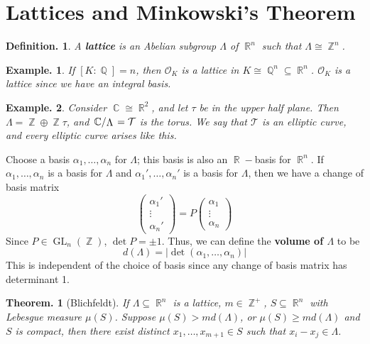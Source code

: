\documentclass[11pt, a4paper]{memoir}
\DeclareMathOperator{\Q}{{\mathbb{Q}}}
\DeclareMathOperator{\Z}{{\mathbb{Z}}}
\DeclareMathOperator{\R}{{\mathbb{R}}}
\DeclareMathOperator{\C}{{\mathbb{C}}}
\theoremstyle{change}
\newtheorem{theorem}{Theorem.}[section]
\theoremstyle{plain}
\theoremstyle{nonumberplain}
\newtheorem{definition}{Definition.}
\newtheorem{example}{Example.}
\DeclareMathOperator{\GL}{GL}
\newcommand{\quot}[2]{\mathchoice{\left.\raisebox{0.14em}{$#1$}\middle/\raisebox{-0.14em}{$#2$}\right.}
                                 {\left.\raisebox{0.08em}{$#1$}\middle/\raisebox{-0.08em}{$#2$}\right.}
                                 {\left.\raisebox{0.03em}{$#1$}\middle/\raisebox{-0.03em}{$#2$}\right.}
                                 {\left.\raisebox{0em}{$#1$}\middle/\raisebox{0em}{$#2$}\right.}}
\begin{document}
\section{Lattices and Minkowski's Theorem}
\begin{definition}
    A \textbf{lattice} is an Abelian subgroup $\Lambda$ of $\R^n$ such that $\Lambda\cong\Z^n$.
\end{definition}
\begin{example}
    If $[K:\Q]=n$, then $\mathcal{O}_K$ is a lattice in $K\cong\Q^n\subseteq\R^n$.
    $\mathcal{O}_K$ is a lattice since we have an integral basis.
\end{example}
\begin{example}
    Consider $\C\cong\R^2$, and let $\tau$ be in the upper half plane.
    Then $\Lambda=\Z\oplus\Z\tau$, and $\quot{\C}{\Lambda}=\mathcal{T}$ is the torus.
    We say that $\mathcal{T}$ is an elliptic curve, and every elliptic curve arises like this.
\end{example}
Choose a basis $\alpha_1,\ldots,\alpha_n$ for $\Lambda$; this basis is also an $\R-$basis for $\R^n$.
If $\alpha_1,\ldots,\alpha_n$ is a basis for $\Lambda$ and $\alpha_1',\ldots,\alpha_n'$ is a basis for $\Lambda$, then we have a change of basis matrix
\begin{equation*}
    \begin{pmatrix}\alpha_1'\\\vdots\\\alpha_n'\end{pmatrix}=P\begin{pmatrix}\alpha_1\\\vdots\\\alpha_n\end{pmatrix}
\end{equation*}
Since $P\in\GL_n(\Z)$, $\det P=\pm 1$.
Thus, we can define the \textbf{volume of $\Lambda$} to be
\begin{equation*}
    d(\Lambda)=|\det(\alpha_1,\ldots,\alpha_n)|
\end{equation*}
This is independent of the choice of basis since any change of basis matrix has determinant 1.
\begin{theorem}[Blichfeldt]
    If $\Lambda\subseteq\R^n$ is a lattice, $m\in\Z^+$, $S\subseteq\R^n$ with Lebesgue measure $\mu(S)$.
    Suppose $\mu(S)>md(\Lambda)$, or $\mu(S)\geq md(\Lambda)$ and $S$ is compact, then there exist distinct $x_1,\ldots,x_{m+1}\in S$ such that $x_i-x_j\in\Lambda$.
\end{theorem}
\end{document}
